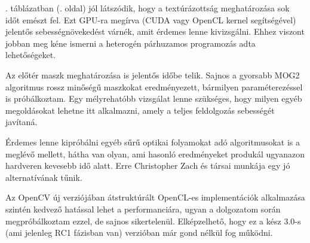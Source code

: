 . táblázatban (\pageref{table:result_scene1_multi_gpu}. oldal) jól látszódik, hogy a textúrázottság meghatározása sok időt emészt fel. Ezt GPU-ra megírva (CUDA vagy OpenCL kernel segítségével) jelentős sebességnövekedést várnék, amit érdemes lenne kivizsgálni. Ehhez viszont jobban meg kéne ismerni a heterogén párhuzamos programozás adta lehetőségeket.

Az előtér maszk meghatározása is jelentős időbe telik. Sajnos a gyorsabb MOG2 algoritmus rossz minőségű maszkokat eredményezett, bármilyen paraméterezéssel is próbálkoztam. Egy mélyrehatóbb vizsgálat lenne szükséges, hogy milyen egyéb megoldásokat lehetne itt alkalmazni, amely a teljes feldolgozás sebességét javítaná.

Érdemes lenne kipróbálni egyéb sűrű optikai folyamokat adó algoritmusokat is a meglévő mellett, hátha van olyan, ami hasonló eredményeket produkál ugyanazon hardveren kevesebb idő alatt. Erre Christopher Zach és társai \cite{zach2007duality} munkája egy jó alternatívának tűnik.

Az OpenCV új verziójában átstruktúrált OpenCL-es implementációk \cite{amd-opencl-opencv} alkalmazása szintén kedvező hatással lehet a performanciára, ugyan a dolgozatom során megpróbálkoztam ezzel, de sajnos sikertelenül. Elképzelhető, hogy ez a kész 3.0-s (ami jelenleg RC1 fázisban van) verzióban már gond nélkül fog működni.
